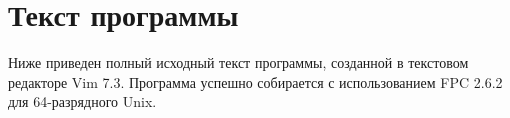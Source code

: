 \section{Текст программы}
Ниже приведен полный исходный текст программы, созданной в текстовом 
редакторе Vim 7.3. Программа успешно собирается с использованием FPC 2.6.2
для 64-разрядного Unix.


\pagebreak
